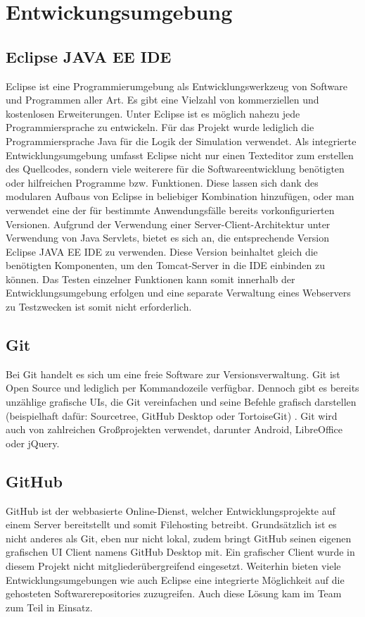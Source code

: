 \clearpage
\chapter{Entwickungsumgebung}
\section{Eclipse JAVA EE IDE}
Eclipse ist eine Programmierumgebung als Entwicklungswerkzeug von Software und Programmen aller Art. Es gibt eine Vielzahl von kommerziellen und kostenlosen Erweiterungen. Unter Eclipse ist es möglich nahezu jede Programmiersprache zu entwickeln. Für das Projekt wurde lediglich die Programmiersprache Java für die Logik der Simulation verwendet. Als integrierte Entwicklungsumgebung umfasst Eclipse nicht nur einen Texteditor zum erstellen des Quellcodes, sondern viele weiterere für die Softwareentwicklung benötigten oder hilfreichen Programme bzw. Funktionen. Diese lassen sich dank des modularen Aufbaus von Eclipse in beliebiger Kombination hinzufügen, oder man verwendet eine der für bestimmte Anwendungsfälle bereits vorkonfigurierten Versionen. Aufgrund der Verwendung einer Server-Client-Architektur unter Verwendung von Java Servlets, bietet es sich an, die entsprechende Version Eclipse JAVA EE IDE zu verwenden. Diese Version beinhaltet gleich die benötigten Komponenten, um den Tomcat-Server in die IDE einbinden zu können. Das Testen einzelner Funktionen kann somit innerhalb der Entwicklungsumgebung erfolgen und eine separate Verwaltung eines Webservers zu Testzwecken ist somit nicht erforderlich.
\section{Git}
Bei Git handelt es sich um eine freie Software zur Versionsverwaltung. Git ist Open Source und lediglich per Kommandozeile verfügbar. Dennoch gibt es bereits unzählige grafische UIs, die Git vereinfachen und seine Befehle grafisch darstellen (beispielhaft dafür: Sourcetree, GitHub Desktop oder TortoiseGit) . Git wird auch von zahlreichen Großprojekten verwendet, darunter Android, LibreOffice oder jQuery. 
\section{GitHub}
GitHub ist der webbasierte Online-Dienst, welcher Entwicklungsprojekte auf einem Server bereitstellt und somit Filehosting betreibt. Grundsätzlich ist es nicht anderes als Git, eben nur nicht lokal, zudem bringt GitHub seinen eigenen grafischen UI Client namens GitHub Desktop mit. Ein grafischer Client wurde in diesem Projekt nicht mitgliederübergreifend eingesetzt. Weiterhin bieten viele Entwicklungsumgebungen wie auch Eclipse eine integrierte Möglichkeit auf die gehosteten Softwarerepositories zuzugreifen. Auch diese Lösung kam im Team zum Teil in Einsatz.
